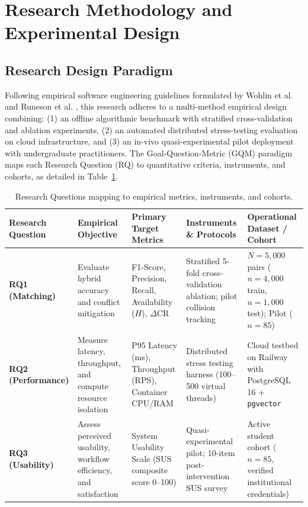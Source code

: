 \documentclass[a4paper,fleqn]{cas-dc}
\begin{document}
\section{Research Methodology and Experimental Design}
\label{sec:methodology}

\subsection{Research Design Paradigm}
Following empirical software engineering guidelines formulated by Wohlin et al. \cite{wohlin2012} and Runeson et al. \cite{runeson2012}, this research adheres to a multi-method empirical design combining: (1) an offline algorithmic benchmark with stratified cross-validation and ablation experiments, (2) an automated distributed stress-testing evaluation on cloud infrastructure, and (3) an in-vivo quasi-experimental pilot deployment with undergraduate practitioners. The Goal-Question-Metric (GQM) paradigm maps each Research Question (RQ) to quantitative criteria, instruments, and cohorts, as detailed in Table~\ref{tbl:gqm}.

\begin{table}[t]
\caption{Research Questions mapping to empirical metrics, instruments, and cohorts.}
\label{tbl:gqm}
\centering
\footnotesize
\setlength{\tabcolsep}{5pt}
\begin{tabularx}{\textwidth}{@{}l p{3.2cm} p{3.2cm} X p{3.0cm}@{}}
\toprule
\textbf{Research Question} & \textbf{Empirical Objective} & \textbf{Primary Target Metrics} & \textbf{Instruments \& Protocols} & \textbf{Operational Dataset / Cohort} \\
\midrule
\textbf{RQ1 (Matching)} & Evaluate hybrid accuracy and conflict mitigation & F1-Score, Precision, Recall, Availability ($H$), $\Delta\text{CR}$ & Stratified 5-fold cross-validation ablation; pilot collision tracking & $N = 5,000$ pairs ($n=4,000$ train, $n=1,000$ test); Pilot ($n=85$) \\
\textbf{RQ2 (Performance)} & Measure latency, throughput, and compute resource isolation & P95 Latency (ms), Throughput (RPS), Container CPU/RAM & Distributed stress testing harness (100--500 virtual threads) & Cloud testbed on Railway with PostgreSQL 16 + \texttt{pgvector} \\
\textbf{RQ3 (Usability)} & Assess perceived usability, workflow efficiency, and satisfaction & System Usability Scale (SUS composite score 0--100) & Quasi-experimental pilot; 10-item post-intervention SUS survey & Active student cohort ($n=85$, verified institutional credentials) \\
\bottomrule
\end{tabularx}
\end{table}
\end{document}
